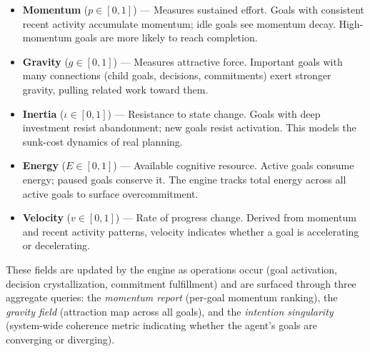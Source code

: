 \documentclass[10pt, twocolumn]{article}
\begin{document}
\begin{itemize}[nosep, leftmargin=*]
  \item \textbf{Momentum} ($p \in [0, 1]$) --- Measures sustained effort. Goals with consistent recent activity accumulate momentum; idle goals see momentum decay. High-momentum goals are more likely to reach completion.
  \item \textbf{Gravity} ($g \in [0, 1]$) --- Measures attractive force. Important goals with many connections (child goals, decisions, commitments) exert stronger gravity, pulling related work toward them.
  \item \textbf{Inertia} ($\iota \in [0, 1]$) --- Resistance to state change. Goals with deep investment resist abandonment; new goals resist activation. This models the sunk-cost dynamics of real planning.
  \item \textbf{Energy} ($E \in [0, 1]$) --- Available cognitive resource. Active goals consume energy; paused goals conserve it. The engine tracks total energy across all active goals to surface overcommitment.
  \item \textbf{Velocity} ($v \in [0, 1]$) --- Rate of progress change. Derived from momentum and recent activity patterns, velocity indicates whether a goal is accelerating or decelerating.
\end{itemize}

These fields are updated by the engine as operations occur (goal activation, decision crystallization, commitment fulfillment) and are surfaced through three aggregate queries: the \emph{momentum report} (per-goal momentum ranking), the \emph{gravity field} (attraction map across all goals), and the \emph{intention singularity} (system-wide coherence metric indicating whether the agent's goals are converging or diverging).
\end{document}
